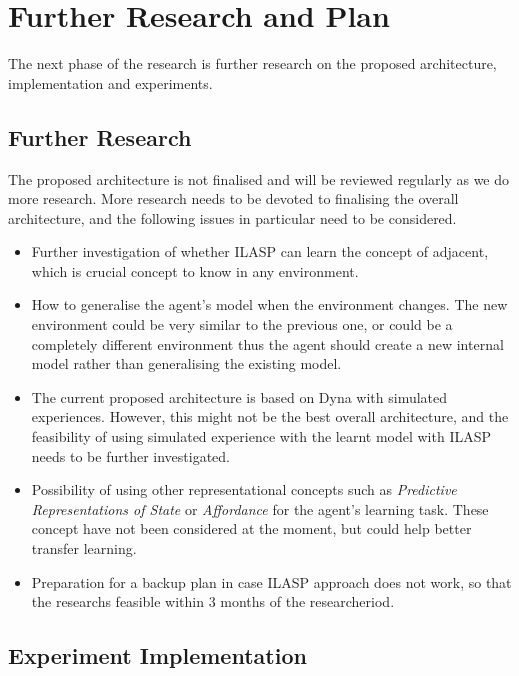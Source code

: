 \documentclass[12pt,twoside]{report}
\begin{document}
\section{Further Research and Plan}
\label{research_plan}
The next phase of the research is further research on the proposed architecture, implementation and experiments.

\subsection{Further Research}
The proposed architecture is not finalised and will be reviewed regularly as we do more research.
More research needs to be devoted to finalising the overall architecture, and the following issues in particular need to be considered.
\begin{itemize}

\item Further investigation of whether ILASP can learn the concept of adjacent, which is crucial concept to know in any environment.
\item How to generalise the agent's model when the environment changes. The new environment could be very similar to the previous one, or could be a completely different environment thus the agent should create a new internal model rather than generalising the existing model.
\item The current proposed architecture is based on Dyna with simulated experiences. However, this might not be the best overall architecture, and the feasibility of using simulated experience with the learnt model with ILASP needs to be further investigated.

\item Possibility of using other representational concepts such as \textit{Predictive Representations of State} or \textit{Affordance} \cite{Sridharan2017} for the agent's learning task. These concept have not been considered at the moment, but could help better transfer learning.

\item Preparation for a backup plan in case ILASP approach does not work, so that the researchs feasible within 3 months of the researcheriod.

\end{itemize}

\subsection{Experiment Implementation}
\end{document}
